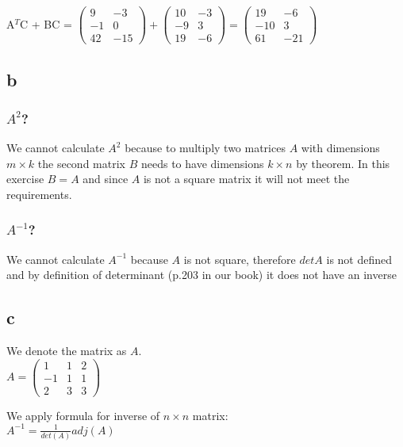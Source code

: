 \documentclass{article}
\begin{document}
A$^{T}$C + BC =
$
\left (
    \begin{matrix}
        9 & -3\\
        -1 & 0\\
        42 & -15
    \end{matrix}
\right )
+
\left (
    \begin{matrix}
        10 & -3\\
        -9 & 3\\
        19 & -6
    \end{matrix}
\right )       
=
\left (
    \begin{matrix}
        19 & -6\\
        -10 & 3\\
        61 & -21
    \end{matrix}
\right )
$

\subsection*{b}

\subsubsection*{$A^{2}$?}
We cannot calculate $A^{2}$ because to multiply two matrices $A$ with dimensions $m \times k$ the second matrix $B$ needs to have dimensions $k \times n$ by theorem. In this exercise $B=A$ and since $A$ is not a square matrix it will not meet the requirements.

\subsubsection*{$A^{-1}$?}
We cannot calculate $A^{-1}$ because $A$ is not square, therefore $detA$ is not defined and by definition of determinant (p.203 in our book) it does not have an inverse

\subsection*{c}
We denote the matrix as $A$.\\
$A=
\left (
    \begin{matrix}
        1 & 1 & 2\\
        -1 & 1 & 1\\
        2 & 3 & 3
    \end{matrix}
\right )
$

We apply formula for inverse of $n \times n$ matrix:\\
$A^{-1} = \frac{1}{det(A)} adj(A)$
\end{document}
